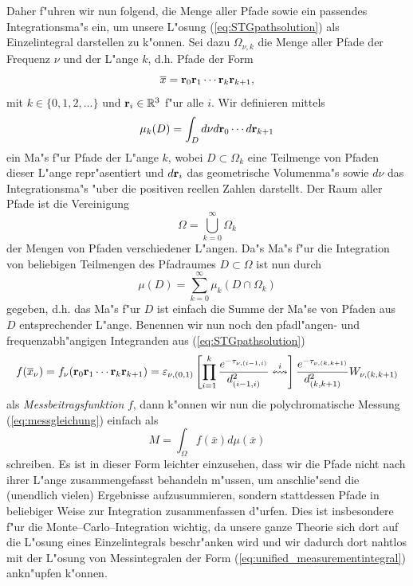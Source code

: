 	Daher f"uhren wir nun \citet[][8.2]{Veach:1997p9136} folgend, die Menge aller Pfade sowie ein passendes Integrationsma"s ein, um unsere L"osung (\ref{eq:STGpathsolution}) als Einzelintegral darstellen zu k"onnen. Sei dazu $\Omega_{\nu,k}$ die Menge aller Pfade der Frequenz $\nu$ und der L"ange $k$, d.h. Pfade der Form
	$${\overline x}=\mathbf{r}_0\mathbf{r}_1\cdots\mathbf{r}_k\mathbf{r}_{k+1},$$
	mit $k\in\{0,1,2,\dots\}$ und $\mathbf{r}_i \in \mathbb{R}^3$ f"ur alle $i$. Wir definieren mittels
	$$\mu_k(D)=\int_D d\nu d\mathbf{r}_0\cdots d\mathbf{r}_{k+1}$$
	ein Ma"s f"ur Pfade der L"ange $k$, wobei $D\subset\Omega_k$ eine Teilmenge von Pfaden dieser L"ange repr"asentiert und $d\mathbf{r}_i$ das geometrische Volumenma"s sowie $d\nu$ das Integrationsma"s "uber die positiven reellen Zahlen darstellt. Der Raum aller Pfade ist die Vereinigung
	$$\Omega=\bigcup_{k=0}^\infty \Omega_k$$
	der Mengen von Pfaden verschiedener L"angen. Da"s Ma"s f"ur die Integration von beliebigen Teilmengen des Pfadraumes $D\subset\Omega$ ist nun durch
	$$\mu(D)=\sum_{k=0}^\infty \mu_k(D\cap\Omega_k)$$
	gegeben, d.h. das Ma"s f"ur $D$ ist einfach die Summe der Ma"se von Pfaden aus $D$ entsprechender L"ange. Benennen wir nun noch den pfadl"angen- und frequenzabh"angigen Integranden aus (\ref{eq:STGpathsolution})
	\begin{equation}
		f({\overline x}_\nu)=f_\nu(\mathbf{r}_0\mathbf{r}_1\cdots\mathbf{r}_k\mathbf{r}_{k+1})=\varepsilon_{\nu,(0,1)}\left[\prod_{i=1}^k\frac{e^{-\tau_{\nu,(i-1,i)}}}{d_{(i-1,i)}^2}\overset{i}{\leftrightsquigarrow}\right]\frac{e^{-\tau_{\nu,(k,k+1)}}}{d_{(k,k+1)}^2} W_{\nu,(k,k+1)}
		\label{eq:mcf}
	\end{equation}
	als {\em Messbeitragsfunktion} $f$, dann k"onnen wir nun die polychromatische Messung (\ref{eq:messgleichung}) einfach als
	\begin{equation}
		M=\int_\Omega f({\overline x})d\mu({\overline x})
		\label{eq:unified_measurementintegral}
	\end{equation}
	schreiben. Es ist in dieser Form leichter einzusehen, dass wir die Pfade nicht nach ihrer L"ange zusammengefasst behandeln m"ussen, um anschlie"send die (unendlich vielen) Ergebnisse aufzusummieren, sondern stattdessen Pfade in beliebiger Weise zur Integration zusammenfassen d"urfen. Dies ist insbesondere f"ur die Monte--Carlo--Integration wichtig, da unsere ganze Theorie sich dort auf die L"osung eines Einzelintegrals beschr"anken wird und wir dadurch dort nahtlos mit der L"osung von Messintegralen der Form (\ref{eq:unified_measurementintegral}) ankn"upfen k"onnen.
